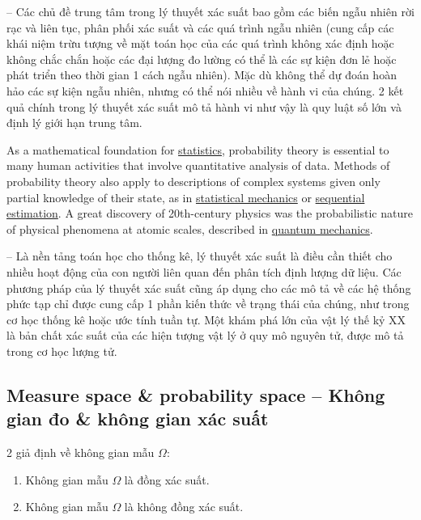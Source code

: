\documentclass{article}
\begin{document}
-- Các chủ đề trung tâm trong lý thuyết xác suất bao gồm các biến ngẫu nhiên rời rạc và liên tục, phân phối xác suất và các quá trình ngẫu nhiên (cung cấp các khái niệm trừu tượng về mặt toán học của các quá trình không xác định hoặc không chắc chắn hoặc các đại lượng đo lường có thể là các sự kiện đơn lẻ hoặc phát triển theo thời gian 1 cách ngẫu nhiên). Mặc dù không thể dự đoán hoàn hảo các sự kiện ngẫu nhiên, nhưng có thể nói nhiều về hành vi của chúng. 2 kết quả chính trong lý thuyết xác suất mô tả hành vi như vậy là quy luật số lớn và định lý giới hạn trung tâm.

As a mathematical foundation for \href{https://en.wikipedia.org/wiki/Statistics}{statistics}, probability theory is essential to many human activities that involve quantitative analysis of data. Methods of probability theory also apply to descriptions of complex systems given only partial knowledge of their state, as in \href{https://en.wikipedia.org/wiki/Statistical_mechanics}{statistical mechanics} or \href{https://en.wikipedia.org/wiki/Sequential_estimation}{sequential estimation}. A great discovery of 20th-century physics was the probabilistic nature of physical phenomena at atomic scales, described in \href{https://en.wikipedia.org/wiki/Quantum_mechanics}{quantum mechanics}.

-- Là nền tảng toán học cho thống kê, lý thuyết xác suất là điều cần thiết cho nhiều hoạt động của con người liên quan đến phân tích định lượng dữ liệu. Các phương pháp của lý thuyết xác suất cũng áp dụng cho các mô tả về các hệ thống phức tạp chỉ được cung cấp 1 phần kiến thức về trạng thái của chúng, như trong cơ học thống kê hoặc ước tính tuần tự. Một khám phá lớn của vật lý thế kỷ XX là bản chất xác suất của các hiện tượng vật lý ở quy mô nguyên tử, được mô tả trong cơ học lượng tử.


\subsection{Measure space \& probability space -- Không gian đo \& không gian xác suất}
2 giả định về không gian mẫu $\Omega$:
\begin{enumerate}
	\item Không gian mẫu $\Omega$ là đồng xác suất.
	\item Không gian mẫu $\Omega$ là không đồng xác suất.
\end{enumerate}
\end{document}
